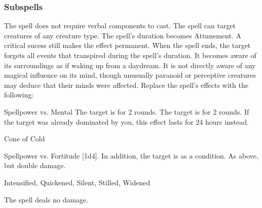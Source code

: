 \subsubsection{Subspells}
The spell does not require verbal components to cast.
The spell can target creatures of any creature type.
The spell's duration becomes Attunement.
A critical sucess still makes the effect permanent.
When the spell ends, the target forgets all events that transpired during the spell's duration.
It becomes aware of its surroundings as if waking up from a daydream.
It is not directly aware of any magical influence on its mind, though unusually paranoid or perceptive creatures may deduce that their minds were affected.
Replace the spell's effects with the following:
\begin{spellcontent}
\begin{augmenteffects}
\begin{spellattack}{Spellpower vs. Mental}
\spellsuccess The target is \confused for 2 rounds.
\spellcritical
The target is \dominated for 2 rounds.
If the target was already dominated by you, this effect lasts for 24 hours instead.
\end{spellattack}
\end{augmenteffects}
\end{spellcontent}
\begin{spellsection}{Cone of Cold}
\begin{spellheader}
\end{spellheader}
\begin{spellcontent}
\begin{spelltargetinginfo}
\end{spelltargetinginfo}
\begin{spelleffects}
\begin{spellattack}{Spellpower vs. Fortitude}
\spellsuccess
{}[1d4].
In addition, the target is \fatigued as a condition.
\spellcritical As above, but double damage.
\end{spellattack}
\end{spelleffects}
\end{spellcontent}
\begin{spellfooter}
 Intensified, Quickened, Silent, Stilled, Widened
\end{spellfooter}
\begin{spellsubcontent}
\begin{spellcantrip}
The spell deals no damage.
\end{spellcantrip}
\end{spellsubcontent}
\end{spellsection}
